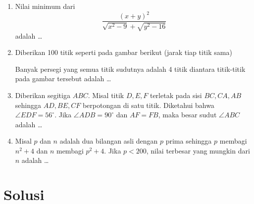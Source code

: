 \documentclass[12pt]{scrartcl}
\begin{document}
\begin{enumerate}[resume]
\item Nilai minimum dari
$$\dfrac{(x+y)^2}{\sqrt{x^2-9}+\sqrt{y^2-16}}$$
adalah \dots

\item Diberikan 100 titik seperti pada gambar berikut (jarak tiap titik sama)
\begin{center}
\end{center}
Banyak persegi yang semua titik sudutnya adalah 4 titik diantara titik-titik pada gambar tersebut adalah \dots

\item Diberikan segitiga $ABC$. Misal titik $D,E,F$ terletak pada sisi $BC,CA,AB$ sehingga $AD,BE,CF$ berpotongan di satu titik. Diketahui bahwa $\angle EDF = 56^\circ$. Jika $\angle ADB = 90^\circ$ dan $AF=FB$, maka besar sudut $\angle ABC$ adalah \dots

\item Misal $p$ dan $n$ adalah dua bilangan asli dengan $p$ prima sehingga $p$ membagi $n^2+4$ dan $n$ membagi $p^2+4$. Jika $p<200$, nilai terbesar yang mungkin dari $n$ adalah \dots
\end{enumerate}

\newpage
\section{Solusi}
\end{document}
